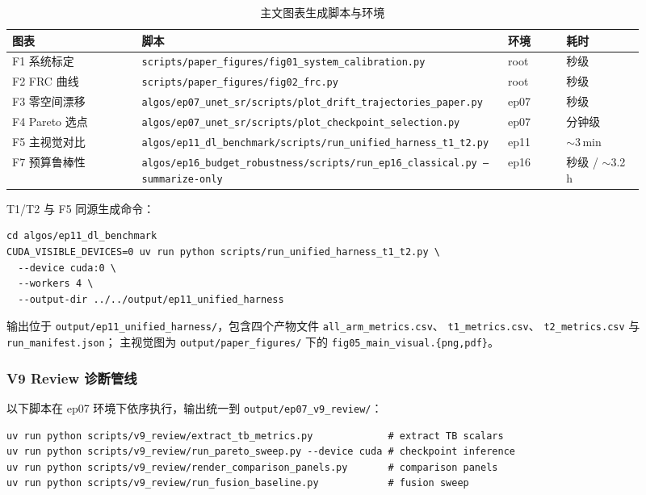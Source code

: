 \begin{table}[ht]
  \centering
  \caption{主文图表生成脚本与环境}
  \label{tab:main-figs}
  \small
  \begin{tabular}{p{0.20\linewidth}p{0.50\linewidth}p{0.09\linewidth}p{0.12\linewidth}}
    \toprule
    图表 & 脚本 & 环境 & 耗时 \\
    \midrule
    F1 系统标定 & \texttt{scripts/paper\_figures/fig01\_system\_calibration.py} & root & 秒级 \\
    F2 FRC 曲线 & \texttt{scripts/paper\_figures/fig02\_frc.py} & root & 秒级 \\
    F3 零空间漂移 & \texttt{algos/ep07\_unet\_sr/scripts/plot\_drift\_trajectories\_paper.py} & ep07 & 秒级 \\
    F4 Pareto 选点 & \texttt{algos/ep07\_unet\_sr/scripts/plot\_checkpoint\_selection.py} & ep07 & 分钟级 \\
    F5 主视觉对比 & \texttt{algos/ep11\_dl\_benchmark/scripts/run\_unified\_harness\_t1\_t2.py} & ep11 & \(\sim\)3\,min \\
    F7 预算鲁棒性 & \texttt{algos/ep16\_budget\_robustness/scripts/run\_ep16\_classical.py --summarize-only} & ep16 & 秒级 / \(\sim\)3.2\,h \\
    \bottomrule
  \end{tabular}
\end{table}

T1/T2 与 F5 同源生成命令：

\begin{verbatim}
cd algos/ep11_dl_benchmark
CUDA_VISIBLE_DEVICES=0 uv run python scripts/run_unified_harness_t1_t2.py \
  --device cuda:0 \
  --workers 4 \
  --output-dir ../../output/ep11_unified_harness
\end{verbatim}

输出位于 \texttt{output/ep11\_unified\_harness/}，包含四个产物文件
\texttt{all\_arm\_metrics.csv}、
\texttt{t1\_metrics.csv}、
\texttt{t2\_metrics.csv} 与
\texttt{run\_manifest.json}；
主视觉图为 \texttt{output/paper\_figures/} 下的 \texttt{fig05\_main\_visual.\{png,pdf\}}。

\subsubsection{V9 Review 诊断管线}

以下脚本在 ep07 环境下依序执行，输出统一到 \texttt{output/ep07\_v9\_review/}：

\begin{verbatim}
uv run python scripts/v9_review/extract_tb_metrics.py             # extract TB scalars
uv run python scripts/v9_review/run_pareto_sweep.py --device cuda # checkpoint inference
uv run python scripts/v9_review/render_comparison_panels.py       # comparison panels
uv run python scripts/v9_review/run_fusion_baseline.py            # fusion sweep
\end{verbatim}

